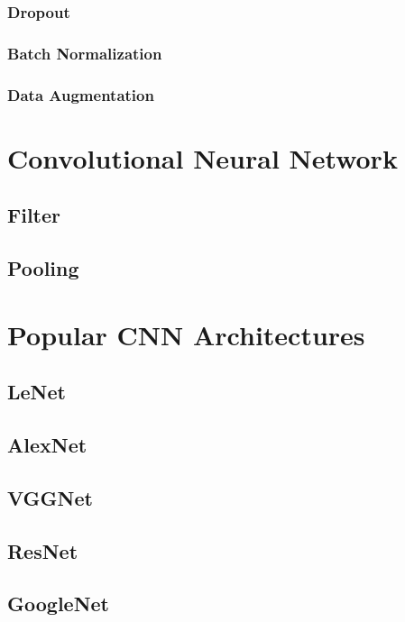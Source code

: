 \documentclass[10pt]{article}
\begin{document}
\subsubsection{Dropout}

\subsubsection{Batch Normalization}

\subsubsection{Data Augmentation}

\section{Convolutional Neural Network}

\subsection{Filter}

\subsection{Pooling}

\section{Popular CNN Architectures}

\subsection{LeNet}

\subsection{AlexNet}

\subsection{VGGNet}

\subsection{ResNet}

\subsection{GoogleNet}
\end{document}
